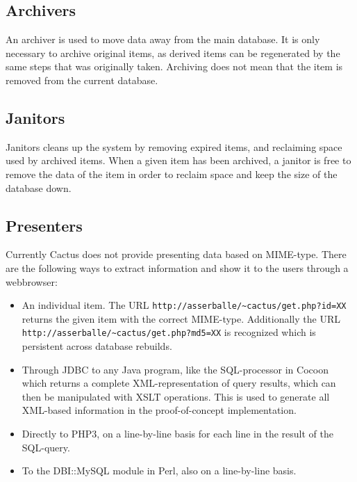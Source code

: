 \subsection{Archivers}

An archiver is used to move data away from the main database.  It is
only necessary to archive original items, as derived items can be
regenerated by the same steps that was originally taken.  Archiving
does not mean that the item is removed from the current database.


\subsection{Janitors}

Janitors cleans up the system by removing expired items, and
reclaiming space used by archived items.  When a given item has been
archived, a janitor is free to remove the data of the item in order to
reclaim space and keep the size of the database down.

\subsection{Presenters}

Currently Cactus does not provide presenting data based on
MIME-type.  There are the following ways to extract
information and show it to the users through a webbrowser:

\begin{itemize}
\item An individual item.  The URL
  \texttt{http://asserballe/\~{}cactus/get.php?id=XX} returns
  the given item with the correct MIME-type.  Additionally
  the URL \texttt{http://asserballe/\~{}cactus/get.php?md5=XX}
  is recognized which is persistent across database
  rebuilds.
  
\item Through JDBC to any Java program, like the SQL-processor in
Cocoon which returns a complete XML-representation of query results,
which can then be manipulated with XSLT operations.  This is used to
generate all XML-based information in the proof-of-concept
implementation.
  
\item Directly to PHP3, on a line-by-line basis for each line in the
  result of the SQL-query.

\item To the DBI::MySQL module in Perl, also on a
  line-by-line basis.
\end{itemize}

